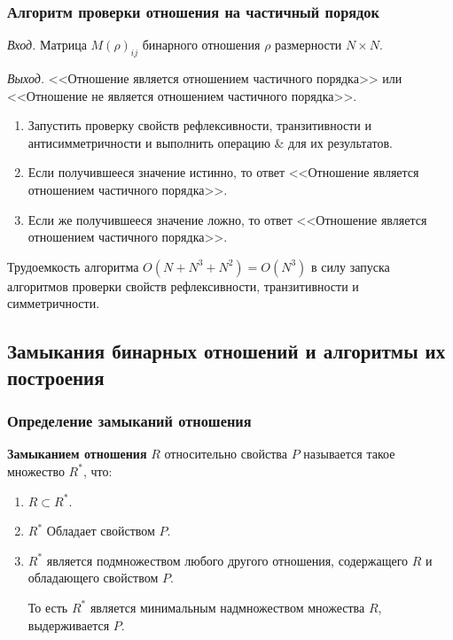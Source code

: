 \documentclass[bachelor, och, labwork]{shiza}
\begin{document}
\subsubsection{Алгоритм проверки отношения на частичный порядок}

\textit{Вход.} Матрица $M(\rho)_{ij}$ бинарного отношения $\rho$ размерности
$N \times N$.

\textit{Выход.} <<Отношение является
отношением частичного порядка>> или <<Отношение не является отношением 
частичного порядка>>.

\begin{enumerate}
    
    \item Запустить проверку свойств рефлексивности, транзитивности и 
    антисимметричности и выполнить операцию \& для их результатов.
    
    \item Если получившееся значение истинно, то ответ <<Отношение является
    отношением частичного порядка>>.
    
    \item Если же получившееся значение ложно, то ответ <<Отношение является
    отношением частичного порядка>>.

\end{enumerate}
Трудоемкость алгоритма $O(N+N^3+N^2) = O(N^3)$ в силу запуска алгоритмов проверки
свойств рефлексивности, транзитивности и симметричности.

\subsection{Замыкания бинарных отношений и алгоритмы их построения}

\subsubsection{Определение замыканий отношения}

\textbf{Замыканием отношения} $R$ относительно свойства $P$ называется такое
множество $R^*$, что:

\begin{enumerate}

    \item $R \subset R^*$.

    \item $R^*$ Обладает свойством $P$.

    \item $R^*$ является подмножеством любого другого отношения, содержащего $R$
    и обладающего свойством $P$. 

    То есть $R^*$ является минимальным надмножеством множества $R$, 
    выдерживается $P$.

\end{enumerate}
\end{document}
